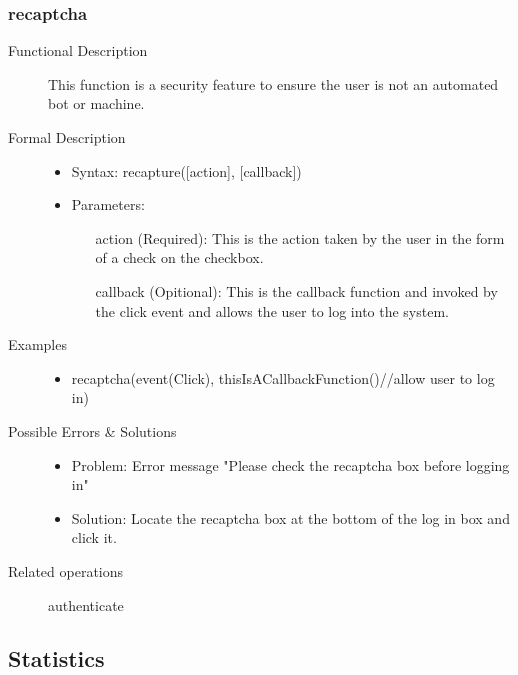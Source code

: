 \documentclass[14pt, a4paper]{article}
\begin{document}
\subsubsection{recaptcha}
\begin{description}
\item[Functional Description] This function is a security feature to ensure the user is not an automated bot or machine.
\item[Formal Description]\hfill
\begin{itemize}
	\item Syntax: recapture([action], [callback])\\
	\item Parameters:
		\begin{itemize}
			\item [action] (Required): This is the action taken by the user in the form of a check on the checkbox.
			\item [callback](Opitional): This is the callback function and invoked by the click event and allows the user to log into the system.
		\end{itemize}
\end{itemize}
\item[Examples]\hfill
\begin{itemize}
	\item recaptcha(event(Click), thisIsACallbackFunction(){//allow user to log in})
\end{itemize}
\item[Possible Errors \& Solutions]
\begin{itemize}
	\item Problem: Error message "Please check the recaptcha box before logging in"
	\item Solution: Locate the recaptcha box at the bottom of the log in box and click it.
\end{itemize}
\item[Related operations] authenticate
\end{description}


\subsection{Statistics}
\end{document}
